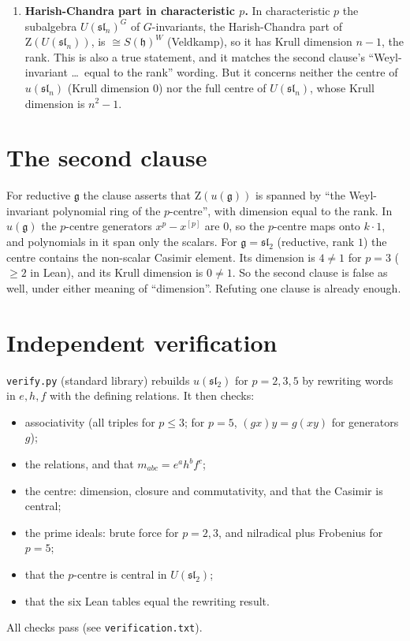 \documentclass[11pt]{article}
\theoremstyle{definition}
\theoremstyle{remark}
\newcommand{\Z}{\mathrm{Z}}
\newcommand{\slt}{\mathfrak{sl}_2}
\newcommand{\sln}{\mathfrak{sl}_n}
\newcommand{\g}{\mathfrak{g}}
\begin{document}
\begin{enumerate}
conjecture explicitly concerns the \emph{restricted} enveloping algebra and the $p$-centre,
which exist only in characteristic $p$. The statement must be judged as written, and as written
it is false.
\item \textbf{Harish-Chandra part in characteristic $p$.} In characteristic $p$ the subalgebra
$U(\sln)^G$ of $G$-invariants, the Harish-Chandra part of $\Z(U(\sln))$, is
$\cong S(\mathfrak h)^{W}$ (Veldkamp), so it has Krull dimension $n-1$, the rank. This is
also a true statement, and it matches the second clause's ``Weyl-invariant \dots\ equal to the
rank'' wording. But it concerns neither the centre of $u(\sln)$ (Krull dimension $0$) nor the full
centre of $U(\sln)$, whose Krull dimension is $n^2-1$.
\end{enumerate}

\section{The second clause}\label{sec:second}
For reductive $\g$ the clause asserts that $\Z(u(\g))$ is spanned by ``the Weyl-invariant
polynomial ring of the $p$-centre'', with dimension equal to the rank. In $u(\g)$ the
$p$-centre generators $x^p-x^{[p]}$ are $0$, so the $p$-centre maps onto $k\cdot 1$, and
polynomials in it span only the scalars. For $\g=\slt$ (reductive, rank $1$) the centre contains
the non-scalar Casimir element. Its dimension is $4\neq1$ for $p=3$ ($\ge2$ in Lean), and its
Krull dimension is $0\neq1$. So the second clause is false as well, under either meaning of
``dimension''. Refuting one clause is already enough.

\section{Independent verification}
\texttt{verify.py} (standard library) rebuilds $u(\slt)$ for $p=2,3,5$ by rewriting words in
$e,h,f$ with the defining relations. It then checks:
\begin{itemize}
\item associativity (all triples for $p\le3$; for $p=5$, $(gx)y=g(xy)$ for generators $g$);
\item the relations, and that $m_{abc}=e^ah^bf^c$;
\item the centre: dimension, closure and commutativity, and that the Casimir is central;
\item the prime ideals: brute force for $p=2,3$, and nilradical plus Frobenius for $p=5$;
\item that the $p$-centre is central in $U(\slt)$;
\item that the six Lean tables equal the rewriting result.
\end{itemize}
All checks pass (see \texttt{verification.txt}).
\end{document}
